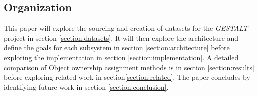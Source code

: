\subsection{Organization}
This paper will explore the sourcing and creation of datasets for the \textit{GESTALT} project in section \ref{section:datasets}. It will then explore the architecture and define the goals for each subsystem in section \ref{section:architecture} before exploring the implementation in section \ref{section:implementation}. A detailed comparison of Object ownership assignment methods is in section \ref{section:results} before exploring related work in section\ref{section:related}. The paper concludes by identifying future work in section \ref{section:conclusion}.  
